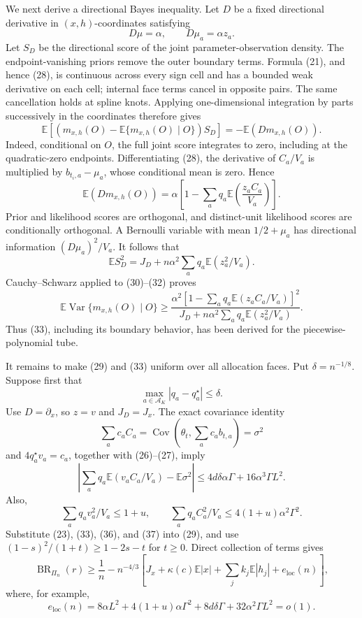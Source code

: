 We next derive a directional Bayes inequality.  Let \(D\) be a fixed directional derivative in \((x,h)\)-coordinates satisfying
\[
D\mu=\alpha,
\qquad
D\mu_a=\alpha z_a.
\]
Let \(S_D\) be the directional score of the joint parameter-observation density.  The endpoint-vanishing priors remove the outer boundary terms.  Formula (21), and hence (28), is continuous across every sign cell and has a bounded weak derivative on each cell; internal face terms cancel in opposite pairs.  The same cancellation holds at spline knots.  Applying one-dimensional integration by parts successively in the coordinates therefore gives
\[
\mathbb E\left[(m_{x,h}(O)-\mathbb E\{m_{x,h}(O)\mid O\})S_D\right]
=-\mathbb E(Dm_{x,h}(O)).
\tag{30}
\]
Indeed, conditional on \(O\), the full joint score integrates to zero, including at the quadratic-zero endpoints.  Differentiating (28), the derivative of \(C_a/V_a\) is multiplied by \(b_{t_i,a}-\mu_a\), whose conditional mean is zero.  Hence
\[
\mathbb E(Dm_{x,h}(O))
=\alpha\left[1-\sum_aq_a\mathbb E\left(\frac{z_aC_a}{V_a}\right)\right].
\tag{31}
\]
Prior and likelihood scores are orthogonal, and distinct-unit likelihood scores are conditionally orthogonal.  A Bernoulli variable with mean \(1/2+\mu_a\) has directional information \((D\mu_a)^2/V_a\).  It follows that
\[
\mathbb ES_D^2
=J_D+n\alpha^2\sum_aq_a\mathbb E(z_a^2/V_a).
\tag{32}
\]
Cauchy--Schwarz applied to (30)--(32) proves
\[
\mathbb E\operatorname{Var}\{m_{x,h}(O)\mid O\}
\ge
\frac{\alpha^2\left[1-\sum_aq_a\mathbb E(z_aC_a/V_a)\right]^2}
{J_D+n\alpha^2\sum_aq_a\mathbb E(z_a^2/V_a)}.
\tag{33}
\]
Thus (33), including its boundary behavior, has been derived for the piecewise-polynomial tube.

It remains to make (29) and (33) uniform over all allocation faces.  Put \(\delta=n^{-1/8}\).  Suppose first that
\[
\max_{a\in\mathcal A_K}|q_a-q_a^\star|\le\delta.
\tag{34}
\]
Use \(D=\partial_x\), so \(z=v\) and \(J_D=J_x\).  The exact covariance identity
\[
\sum_ac_aC_a
=\operatorname{Cov}\left(\theta_t,\sum_ac_ab_{t,a}\right)=\sigma^2
\tag{35}
\]
and \(4q_a^\star v_a=c_a\), together with (26)--(27), imply
\[
\left|\sum_aq_a\mathbb E(v_aC_a/V_a)-\mathbb E\sigma^2\right|
\le4d\delta\alpha\Gamma+16\alpha^3\Gamma L^2.
\tag{36}
\]
Also,
\[
\sum_aq_av_a^2/V_a\le1+u,
\qquad
\sum_aq_aC_a^2/V_a\le4(1+u)\alpha^2\Gamma^2.
\tag{37}
\]
Substitute (23), (33), (36), and (37) into (29), and use \((1-s)^2/(1+t)\ge1-2s-t\) for \(t\ge0\).  Direct collection of terms gives
\[
\operatorname{BR}_{\Pi_n}(r)
\ge\frac1n-n^{-4/3}\left[J_x+\kappa(c)\mathbb E|x|
+\sum_jk_j\mathbb E|h_j|+e_{\mathrm{loc}}(n)\right],
\tag{38}
\]
where, for example,
\[
e_{\mathrm{loc}}(n)=8\alpha L^2+4(1+u)\alpha\Gamma^2
+8d\delta\Gamma+32\alpha^2\Gamma L^2=o(1).
\tag{39}
\]

